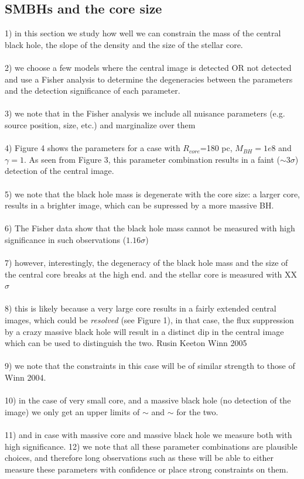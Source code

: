 \documentclass[chicago]{emulateapj}
\begin{document}
\begin{framed}
\subsection{SMBHs and the core size}
1) in this section we study how well we can constrain the mass of the central black hole, the slope of the density and the size of the stellar core. \\ \\
2) we choose a few models where the central image is detected OR not detected and use a Fisher analysis to determine the degeneracies between the parameters and the detection significance of each parameter.  \\ \\
3) we note that in the Fisher analysis we include all nuisance parameters (e.g. source position, size, etc.) and marginalize over them  \\ \\
4) Figure 4 shows the parameters for a case with $R_{core}$=180 pc, $M_{BH}=1e8$ and $\gamma=1$. As seen from Figure 3,  this parameter combination results in a faint ($\sim3\sigma$) detection of the central image. \\ \\
5) we note that the black hole mass is degenerate with the core size: a larger core, results in a brighter image, which can be supressed by a more massive BH. \\ \\
6) The Fisher data show that the black hole mass cannot be measured with high significance in such observations ($1.16\sigma$) \\ \\
7) however, interestingly, the degeneracy of the black hole mass and the size of the central core breaks at the high end. and the stellar core is measured with XX $\sigma$\\ \\
8) this is likely because a very large core results in a fairly extended central images, which could be \emph{resolved} (see Figure 1), in that case, the flux suppression by a crazy massive black hole will result in a distinct dip in the central image  which can be used to distinguish the two. Rusin  Keeton Winn 2005 %
\\ \\

9) we note that the constraints in this case will be of similar strength to those of Winn 2004. \\ \\ 
10) in the case of very small core, and a massive black hole (no detection of the image) we only get an upper limits of $\sim$ and $\sim$ for the two. \\ \\
11) and in case with massive core and massive black hole we measure both with high significance. 
12) we note that all these parameter combinations are plausible choices, and therefore long observations such as these will be able to either measure these parameters with confidence or place strong constraints on them.


\end{framed}
\end{document}
